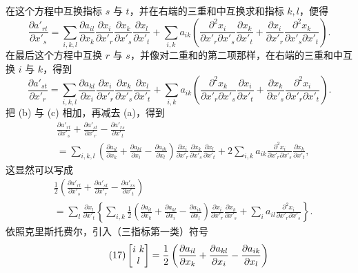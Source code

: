 在这个方程中互换指标 \(s\) 与 \(t\)，并在右端的三重和中互换求和指标 \(k,l\)，便得
\begin{equation}\tag{b}
\frac{\partial a'_{rt}}{\partial x'_s}=\sum_{i,k,l}\frac{\partial a_{il}}{\partial x_k}\frac{\partial x_i}{\partial x'_r}\frac{\partial x_k}{\partial x'_s}\frac{\partial x_l}{\partial x'_t}
+\sum_{i,k}a_{ik}\left(\frac{\partial^2x_i}{\partial x'_r\partial x'_s}\frac{\partial x_k}{\partial x'_t}
+\frac{\partial x_i}{\partial x'_r}\frac{\partial^2x_k}{\partial x'_s\partial x'_t}\right).
\end{equation}
在最后这个方程中互换 \(r\) 与 \(s\)，并像对二重和的第二项那样，在右端的三重和中互换 \(i\) 与 \(k\)，得到
\begin{equation}\tag{c}
\frac{\partial a'_{st}}{\partial x'_r}=\sum_{i,k,l}\frac{\partial a_{kl}}{\partial x_i}\frac{\partial x_i}{\partial x'_r}\frac{\partial x_k}{\partial x'_s}\frac{\partial x_l}{\partial x'_t}
+\sum_{i,k}a_{ik}\left(\frac{\partial^2x_k}{\partial x'_r\partial x'_s}\frac{\partial x_i}{\partial x'_t}
+\frac{\partial x_k}{\partial x'_s}\frac{\partial^2x_i}{\partial x'_r\partial x'_t}\right).
\end{equation}
把 (b) 与 (c) 相加，再减去 (a)，得到
\[
\begin{aligned}
&\frac{\partial a'_{rt}}{\partial x'_s}+\frac{\partial a'_{st}}{\partial x'_r}-\frac{\partial a'_{rs}}{\partial x'_t}\\
&=\sum_{i,k,l}\left(\frac{\partial a_{il}}{\partial x_k}+\frac{\partial a_{kl}}{\partial x_i}-\frac{\partial a_{ik}}{\partial x_l}\right)
\frac{\partial x_i}{\partial x'_r}\frac{\partial x_k}{\partial x'_s}\frac{\partial x_l}{\partial x'_t}
+2\sum_{i,k}a_{ik}\frac{\partial^2x_i}{\partial x'_r\partial x'_s}\frac{\partial x_k}{\partial x'_t},
\end{aligned}
\]
这显然可以写成
\[
\begin{aligned}
&\frac{1}{2}\left(\frac{\partial a'_{rt}}{\partial x'_s}+\frac{\partial a'_{st}}{\partial x'_r}-\frac{\partial a'_{rs}}{\partial x'_t}\right)\\
&=\sum_l\frac{\partial x_l}{\partial x'_t}
\left\{\sum_{i,k}\frac{1}{2}\left(\frac{\partial a_{il}}{\partial x_k}+\frac{\partial a_{kl}}{\partial x_i}-\frac{\partial a_{ik}}{\partial x_l}\right)
\frac{\partial x_i}{\partial x'_r}\frac{\partial x_k}{\partial x'_s}
+\sum_i a_{il}\frac{\partial^2x_i}{\partial x'_r\partial x'_s}\right\}.
\end{aligned}
\]
依照克里斯托费尔，引入（三指标第一类）符号
\begin{equation}\tag{17}
\left[\begin{matrix}i\ k\\ l\end{matrix}\right]=\frac{1}{2}\left(\frac{\partial a_{il}}{\partial x_k}+\frac{\partial a_{kl}}{\partial x_i}-\frac{\partial a_{ik}}{\partial x_l}\right)
\end{equation}
